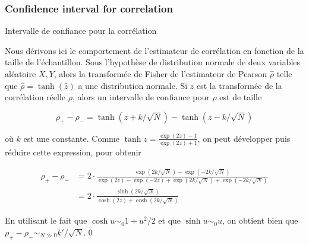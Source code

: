 \subsubsection{Confidence interval for correlation}{Intervalle de confiance pour la corrélation}

Nous dérivons ici le comportement de l'estimateur de corrélation en fonction de la taille de l'échantillon. Sous l'hypothèse de distribution normale de deux variables aléatoire $X,Y$, alors la transformée de Fisher de l'estimateur de Pearson $\hat{\rho}$ telle que $\hat{\rho} = \tanh (\hat{z})$ a une distribution normale. Si $z$ est la transformée de la corrélation réelle $\rho$, alors un intervalle de confiance pour $\rho$ est de taille

\[
\rho_{+} - \rho_{-} = \tanh (z + k / \sqrt{N}) - \tanh (z - k / \sqrt{N})
\]

où $k$ est une constante. Comme $\tanh{z} = \frac{\exp (2z) - 1}{\exp (2z) + 1}$, on peut développer puis réduire cette expression, pour obtenir

\[
\begin{split}
	\rho_{+} - \rho_{-} & = 2\cdot \frac{\exp (2k/\sqrt{N})-\exp (-2k/\sqrt{N})}{\exp (2z)-\exp (-2z) + \exp (2k/\sqrt{N}) + \exp (-2k/\sqrt{N})}\\
	& = 2\cdot \frac{\sinh{(2k/\sqrt{N})}}{\cosh{(2z)} + \cosh{(2k/\sqrt{N})}}
\end{split}
\]

En utilisant le fait que $\cosh u \sim_0 1 + u^2/2$ et que $\sinh u \sim_0 u$, on obtient bien que $\rho_{+} - \rho_{-} \sim_{N\gg 0} k' / \sqrt{N}$.\qed







